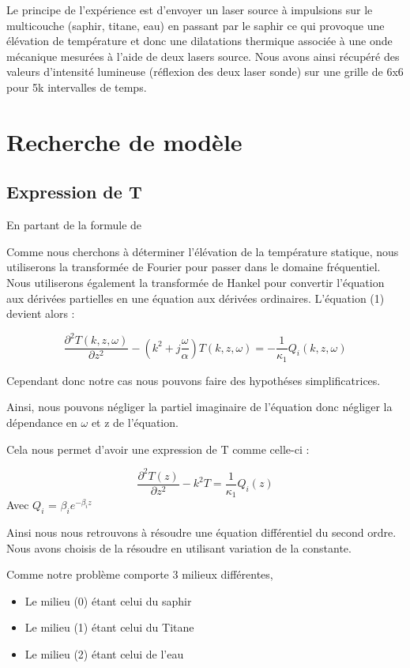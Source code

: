 \documentclass{rapportECC}
\begin{document}
Le principe de l'expérience est d'envoyer un laser source à impulsions sur le multicouche (saphir, titane, eau) en passant par le saphir ce qui provoque une élévation de température et donc une dilatations thermique associée à une onde mécanique mesurées à l'aide de deux lasers source. Nous avons ainsi récupéré des valeurs d'intensité lumineuse (réflexion des deux laser sonde) sur une grille de 6x6 pour 5k intervalles de temps.

\section{Recherche de modèle}

\subsection{Expression de T}

En partant de la formule de 

Comme nous cherchons à déterminer l’élévation de la température statique,
nous utiliserons la transformée de Fourier pour passer dans le domaine
fréquentiel. Nous utiliserons également la transformée de Hankel pour convertir
l’équation aux dérivées partielles en une équation aux dérivées ordinaires.
L’équation (1) devient alors :

\begin{equation}
    \frac{\partial^2 T(k,z,\omega)}{\partial z^2} - (k^2 + j\frac{\omega}{\alpha}) T(k,z,\omega) = - \frac{1}{\kappa_1} Q_i(k,z,\omega)
\end{equation}

Cependant donc notre cas nous pouvons faire des hypothéses simplificatrices.

Ainsi, nous pouvons négliger la partiel imaginaire de l'équation donc négliger la dépendance en $\omega$ et z de l'équation.

Cela nous permet d'avoir une expression de T comme celle-ci :

\begin{equation}
    \frac{\partial^2 T(z)}{\partial z^2} - k^2 T = \frac{1}{\kappa_1}Q_i(z)
\end{equation}
Avec $Q_i$ = $\beta_i e^{-\beta_i z}$


Ainsi nous nous retrouvons à résoudre une équation différentiel du second ordre.\\
Nous avons choisis de la résoudre en utilisant variation de la constante.

Comme notre problème comporte 3 milieux différentes,
\begin{itemize}
    \item Le milieu (0) étant celui du saphir
    \item Le milieu (1) étant celui du Titane
    \item Le milieu (2) étant celui de l'eau
\end{itemize}
\end{document}

